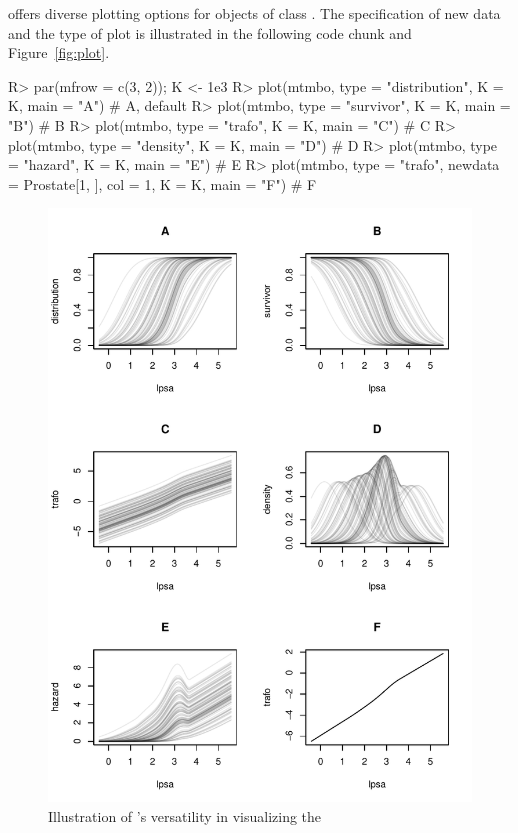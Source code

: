  offers diverse plotting options for objects of class .
The specification of new data and the type of plot is illustrated in the following code
chunk and Figure~\ref{fig:plot}.
\begin{example}
R> par(mfrow = c(3, 2)); K <- 1e3
R> plot(mtmbo, type = "distribution", K = K, main = "A") # A, default
R> plot(mtmbo, type = "survivor", K = K, main = "B") # B
R> plot(mtmbo, type = "trafo", K = K, main = "C") # C
R> plot(mtmbo, type = "density", K = K, main = "D") # D
R> plot(mtmbo, type = "hazard", K = K, main = "E") # E
R> plot(mtmbo, type = "trafo", newdata = Prostate[1, ], col = 1, K = K, main = "F") # F
\end{example}

\begin{figure}[!ht]
\centering \includegraphics{plot_method_fig-1} 
\caption{Illustration of 's versatility in visualizing the
}
\end{figure}
